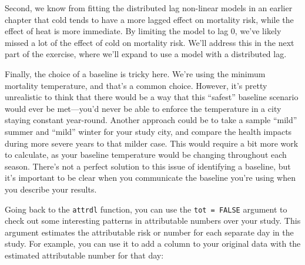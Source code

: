\documentclass[
]{book}
\newenvironment{Shaded}{\begin{snugshade}}{\end{snugshade}}
\newcommand{\AttributeTok}[1]{\textcolor[rgb]{0.77,0.63,0.00}{#1}}
\newcommand{\ConstantTok}[1]{\textcolor[rgb]{0.00,0.00,0.00}{#1}}
\newcommand{\DecValTok}[1]{\textcolor[rgb]{0.00,0.00,0.81}{#1}}
\newcommand{\FunctionTok}[1]{\textcolor[rgb]{0.00,0.00,0.00}{#1}}
\newcommand{\NormalTok}[1]{#1}
\newcommand{\OtherTok}[1]{\textcolor[rgb]{0.56,0.35,0.01}{#1}}
\newcommand{\SpecialCharTok}[1]{\textcolor[rgb]{0.00,0.00,0.00}{#1}}
\newcommand{\StringTok}[1]{\textcolor[rgb]{0.31,0.60,0.02}{#1}}
\begin{document}
Second, we know from fitting the distributed lag non-linear models in an earlier chapter that cold tends to have a more lagged effect on mortality risk, while the effect of heat is more immediate. By limiting the model to lag 0, we've likely missed a lot of the effect of cold on mortality risk. We'll address this in the next part of the exercise, where we'll expand to use a model with a distributed lag.

Finally, the choice of a baseline is tricky here. We're using the minimum mortality temperature, and that's a common choice. However, it's pretty unrealistic to think that there would be a way that this ``safest'' baseline scenario would ever be met---you'd never be able to enforce the temperature in a city staying constant year-round. Another approach could be to take a sample ``mild'' summer and ``mild'' winter for your study city, and compare the health impacts during more severe years to that milder case. This would require a bit more work to calculate, as your baseline temperature would be changing throughout each season. There's not a perfect solution to this issue of identifying a baseline, but it's important to be clear when you communicate the baseline you're using when you describe your results.

Going back to the \texttt{attrdl} function, you can use the \texttt{tot\ =\ FALSE} argument to check out some interesting patterns in attributable numbers over your study. This argument estimates the attributable risk or number for each separate day in the study. For example, you can use it to add a column to your original data with the estimated attributable number for that day:

\begin{Shaded}
\end{Shaded}
\end{document}
